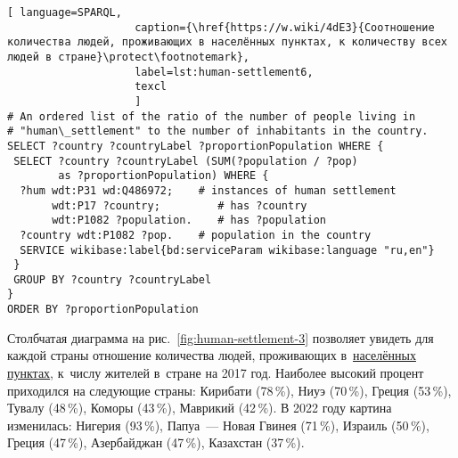 \begin{lstlisting}[ language=SPARQL, 
                    caption={\href{https://w.wiki/4dE3}{Соотношение количества людей, проживающих в населённых пунктах, к количеству всех людей в стране}\protect\footnotemark},
                    label=lst:human-settlement6,
                    texcl 
                    ]
# An ordered list of the ratio of the number of people living in 
# "human\_settlement" to the number of inhabitants in the country.
SELECT ?country ?countryLabel ?proportionPopulation WHERE {
 SELECT ?country ?countryLabel (SUM(?population / ?pop) 
        as ?proportionPopulation) WHERE {
  ?hum wdt:P31 wd:Q486972;    # instances of human settlement  
       wdt:P17 ?country;         # has ?country 
       wdt:P1082 ?population.    # has ?population
  ?country wdt:P1082 ?pop.    # population in the country
  SERVICE wikibase:label{bd:serviceParam wikibase:language "ru,en"}
 }
 GROUP BY ?country ?countryLabel
}
ORDER BY ?proportionPopulation
\end{lstlisting}%


Столбчатая диаграмма на рис.~\ref{fig:human-settlement-3} позволяет увидеть для каждой страны 
отношение количества людей, 
проживающих в~\href{http://www.wikidata.org/entity/Q486972}{населённых пунктах}, 
к~числу жителей в~стране на 2017 год.
Наиболее высокий процент приходился на следующие страны: 
Кирибати (78\,\%), Ниуэ (70\,\%), Греция (53\,\%), Тувалу (48\,\%), Коморы (43\,\%), Маврикий (42\,\%). 
В 2022 году картина изменилась: Нигерия (93\,\%), Папуа~--- Новая Гвинея (71\,\%), 
Израиль (50\,\%), Греция (47\,\%), Азербайджан (47\,\%), Казахстан (37\,\%). 



